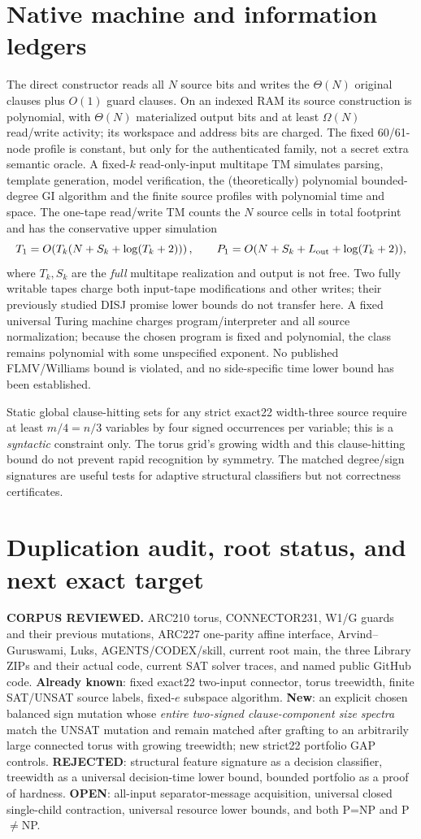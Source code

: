 \documentclass[10pt]{article}
\begin{document}
\section{Native machine and information ledgers}
The direct constructor reads all $N$ source bits and writes the $\Theta(N)$ original clauses plus $O(1)$ guard clauses. On an indexed RAM its source construction is polynomial, with $\Theta(N)$ materialized output bits and at least $\Omega(N)$ read/write activity; its workspace and address bits are charged. The fixed 60/61-node profile is constant, but only for the authenticated family, not a secret extra semantic oracle. A fixed-$k$ read-only-input multitape TM simulates parsing, template generation, model verification, the (theoretically) polynomial bounded-degree GI algorithm and the finite source profiles with polynomial time and space. The one-tape read/write TM counts the $N$ source cells in total footprint and has the conservative upper simulation
\[
 T_1=O\!\left(T_k(N+S_k+\log(T_k+2))\right),\qquad
 P_1=O(N+S_k+L_{\rm out}+\log(T_k+2)),
\]
where $T_k,S_k$ are the \emph{full} multitape realization and output is not free. Two fully writable tapes charge both input-tape modifications and other writes; their previously studied DISJ promise lower bounds do not transfer here. A fixed universal Turing machine charges program/interpreter and all source normalization; because the chosen program is fixed and polynomial, the class remains polynomial with some unspecified exponent. No published FLMV/Williams bound is violated, and no side-specific time lower bound has been established.

Static global clause-hitting sets for any strict exact22 width-three source require at least $m/4=n/3$ variables by four signed occurrences per variable; this is a \emph{syntactic} constraint only. The torus grid's growing width and this clause-hitting bound do not prevent rapid recognition by symmetry. The matched degree/sign signatures are useful tests for adaptive structural classifiers but not correctness certificates.
\section{Duplication audit, root status, and next exact target}
\noindent\textbf{CORPUS REVIEWED.} ARC210 torus, CONNECTOR231, W1/G guards and their previous mutations, ARC227 one-parity affine interface, Arvind--Guruswami, Luks, AGENTS/CODEX/skill, current root main, the three Library ZIPs and their actual code, current SAT solver traces, and named public GitHub code. \textbf{Already known}: fixed exact22 two-input connector, torus treewidth, finite SAT/UNSAT source labels, fixed-$e$ subspace algorithm. \textbf{New}: an explicit chosen balanced sign mutation whose \emph{entire two-signed clause-component size spectra} match the UNSAT mutation and remain matched after grafting to an arbitrarily large connected torus with growing treewidth; new strict22 portfolio GAP controls. \textbf{REJECTED}: structural feature signature as a decision classifier, treewidth as a universal decision-time lower bound, bounded portfolio as a proof of hardness. \textbf{OPEN}: all-input separator-message acquisition, universal closed single-child contraction, universal resource lower bounds, and both P=NP and P$\ne$NP.
\end{document}
